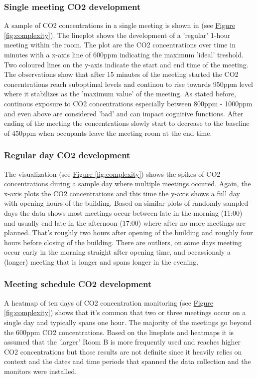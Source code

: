 \subsubsection{Single meeting CO2 development}

A sample of CO2 concentrations in a single meeting is shown in (see \hyperref[fig:complexity]{Figure \ref*{fig:complexity}}). The lineplot shows the development of a 'regular' 1-hour meeting within the room. The plot are the CO2 concentrations over time in minutes with a x-axis line of 600ppm indicating the maximum 'ideal' treshold. Two coloured lines on the y-axis indicate the start and end time of the meeting. The observations show that after 15 minutes of the meeting started the CO2 concentrations reach suboptimal levels and continou to rise towards 950ppm level where it stabilizes as the 'maximum value' of the meeting. As stated before, continous exposure to CO2 concentrations especially between 800ppm - 1000ppm and even above are considered 'bad' and can impact cognitive functions. After ending of the meeting the concentrations slowly start to decrease to the baseline of 450ppm when occupants leave the meeting room at the end time.

\subsubsection{Regular day CO2 development}

The visualization (see \hyperref[fig:complexity]{Figure \ref*{fig:complexity}}) shows the spikes of CO2 concentrations during a sample day where multiple meetings occured. Again, the x-axis plots the CO2 concentrations and this time the y-axis shows a full day with opening hours of the building. Based on similar plots of randomly sampled days the data shows most meetings occur between late in the morning (11:00) and usually end late in the afternoon (17:00) where after no more meetings are planned. That's roughly two hours after opening of the building and roughly four hours before closing of the building. There are outliers, on some days meeting occur early in the morning straight after opening time, and occassionaly a (longer) meeting that is longer and spans longer in the evening.

\subsubsection{Meeting schedule CO2 development}

A heatmap of ten days of CO2 concentration monitoring (see \hyperref[fig:complexity]{Figure \ref*{fig:complexity}}) shows that it's common that two or three meetings occur on a single day and typically spans one hour. The majority of the meetings go beyond the 600ppm CO2 concentrations. Based on the lineplots and heatmaps it is assumed that the 'larger' Room B is more frequently used and reaches higher CO2 concentrations but those results are not definite since it heavily relies on context and the dates and time periods that spanned the data collection and the monitors were installed.

